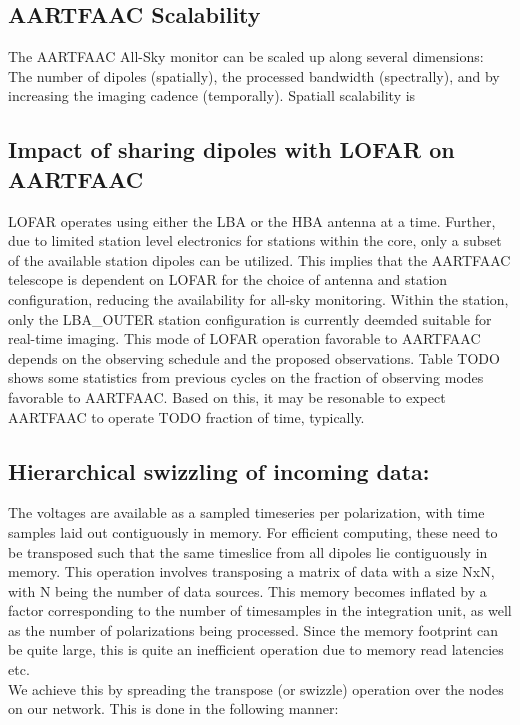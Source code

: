 \documentclass{aa}
\begin{document}
\subsection {AARTFAAC Scalability}
The AARTFAAC  All-Sky monitor  can be  scaled up  along several  dimensions: The
number  of dipoles  (spatially), the  processed bandwidth  (spectrally), and  by
increasing the imaging cadence (temporally). Spatiall scalability is 

\subsection {\label{subsec:impact_lofar} Impact of sharing dipoles with LOFAR on AARTFAAC}
LOFAR operates using either  the LBA or the HBA antenna at  a time. Further, due
to limited station level electronics for stations within the core, only a subset
of the available station dipoles can be utilized. This implies that the AARTFAAC
telescope  is  dependent  on  LOFAR  for  the  choice  of  antenna  and  station
configuration,  reducing the  availability  for all-sky  monitoring. Within  the
station, only the LBA\_OUTER station configuration is currently deemded suitable
for  real-time imaging.   This mode  of  LOFAR operation  favorable to  AARTFAAC
depends on  the observing  schedule and the  proposed observations.   Table TODO
shows some  statistics from previous cycles  on the fraction of  observing modes
favorable to AARTFAAC. Based on this, it  may be resonable to expect AARTFAAC to
operate TODO fraction of time, typically.

\subsection {Hierarchical swizzling of incoming data:} The voltages are available as
a sampled timeseries  per polarization, with time samples  laid out contiguously
in memory.  For  efficient computing, these need to be  transposed such that the
same  timeslice from  all dipoles  lie  contiguously in  memory. This  operation
involves transposing a matrix  of data with a size NxN, with  N being the number
of data sources.  This memory becomes  inflated by a factor corresponding to the
number  of  timesamples in  the  integration  unit, as  well  as  the number  of
polarizations being  processed. Since the  memory footprint can be  quite large,
this is quite an inefficient operation due to memory read latencies etc.\\

We achieve this by spreading the transpose (or swizzle) operation over the nodes
on our network. This is done in the following manner:
   
\end{document}
